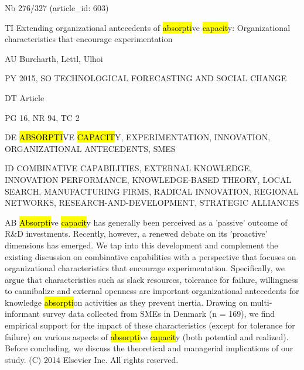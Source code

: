 \documentclass[a4paper]{article}
\begin{document}
\vspace*{-2cm}
Nb \tabto{0cm}276/327 (article\_id: 603)\par
TI \tabto{0cm}Extending organizational antecedents of \hl{absorpti}ve \hl{capacit}y: Organizational characteristics that encourage experimentation\par
AU \tabto{0cm}Burcharth, Lettl, Ulhoi\par
PY \tabto{0cm}2015, SO TECHNOLOGICAL FORECASTING AND SOCIAL CHANGE\par
DT \tabto{0cm}Article\par
PG \tabto{0cm}16, NR 94, TC 2\par
DE \tabto{0cm}\hl{ABSORPTI}VE \hl{CAPACIT}Y, EXPERIMENTATION, INNOVATION, ORGANIZATIONAL ANTECEDENTS, SMES\par
ID \tabto{0cm}COMBINATIVE CAPABILITIES, EXTERNAL KNOWLEDGE, INNOVATION PERFORMANCE, KNOWLEDGE-BASED THEORY, LOCAL SEARCH, MANUFACTURING FIRMS, RADICAL INNOVATION, REGIONAL NETWORKS, RESEARCH-AND-DEVELOPMENT, STRATEGIC ALLIANCES\par
AB \tabto{0cm}\hl{Absorpti}ve \hl{capacit}y has generally been perceived as a 'passive' outcome of R\&D investments. Recently, however, a renewed debate on its 'proactive' dimensions has emerged. We tap into this development and complement the existing discussion on combinative capabilities with a perspective that focuses on organizational characteristics that encourage experimentation. Specifically, we argue that characteristics such as slack resources, tolerance for failure, willingness to cannibalize and external openness are important organizational antecedents for knowledge \hl{absorpti}on activities as they prevent inertia. Drawing on multi-informant survey data collected from SMEs in Denmark (n = 169), we find empirical support for the impact of these characteristics (except for tolerance for failure) on various aspects of \hl{absorpti}ve \hl{capacit}y (both potential and realized). Before concluding, we discuss the theoretical and managerial implications of our study. (C) 2014 Elsevier Inc. All rights reserved.\par
\clearpage
\end{document}
